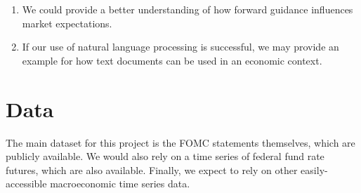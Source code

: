 \documentclass{article}\usepackage[]{graphicx}\usepackage[]{color}
\begin{document}
\begin{enumerate}
	\item We could provide a better understanding of how forward guidance influences market expectations.
	\item If our use of natural language processing is successful, we may provide an example for how text documents can be used in an economic context.
\end{enumerate}

\section{Data}

The main dataset for this project is the FOMC statements themselves, which are publicly available. We would also rely on a time series of federal fund rate futures, which are also available. Finally, we expect to rely on other easily-accessible macroeconomic time series data.

\clearpage

\nocite{gurkaynak2005actions}
\nocite{campbell2012macroeconomic}
\nocite{le2014distributed}



\end{document}
